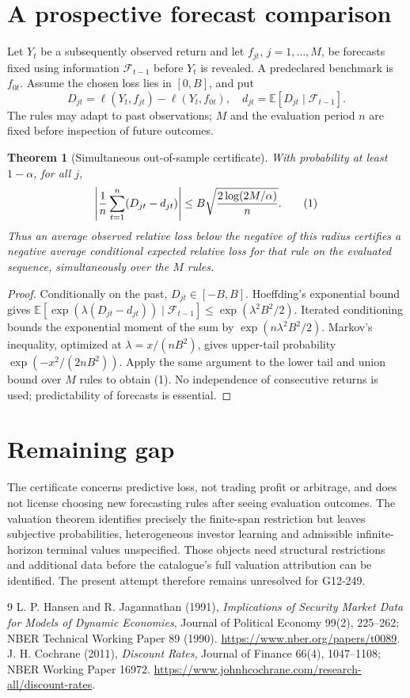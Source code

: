 \documentclass[11pt]{article}
\newtheorem{theorem}{Theorem}
\theoremstyle{definition}
\begin{document}
\section*{A prospective forecast comparison}
Let $Y_t$ be a subsequently observed return and let $f_{jt}$, $j=1,\ldots,M$,
be forecasts fixed using information $\mathcal F_{t-1}$ before $Y_t$ is
revealed. A predeclared benchmark is $f_{0t}$. Assume the chosen loss lies
in $[0,B]$, and put
\[
 D_{jt}=\ell(Y_t,f_{jt})-\ell(Y_t,f_{0t}),\quad
 d_{jt}=\mathbb E[D_{jt}\mid\mathcal F_{t-1}].
\]
The rules may adapt to past observations; $M$ and the evaluation period
$n$ are fixed before inspection of future outcomes.
\begin{theorem}[Simultaneous out-of-sample certificate]
With probability at least $1-\alpha$, for all $j$,
\[
 \left|{1\over n}\sum_{t=1}^n(D_{jt}-d_{jt})\right|
 \le B\sqrt{2\log(2M/\alpha)\over n}. \tag{1}
\]
Thus an average observed relative loss below the negative of this radius
certifies a negative average conditional expected relative loss for that
rule on the evaluated sequence, simultaneously over the $M$ rules.
\end{theorem}
\begin{proof}
Conditionally on the past, $D_{jt}\in[-B,B]$. Hoeffding's exponential
bound gives
$\mathbb E[\exp(\lambda(D_{jt}-d_{jt}))\mid\mathcal F_{t-1}]
\le\exp(\lambda^2B^2/2)$.
Iterated conditioning bounds the exponential moment of the sum by
$\exp(n\lambda^2B^2/2)$. Markov's inequality, optimized at
$\lambda=x/(nB^2)$, gives upper-tail probability
$\exp(-x^2/(2nB^2))$. Apply the same argument to the lower tail and
union bound over $M$ rules to obtain (1). No independence of consecutive
returns is used; predictability of forecasts is essential.
\end{proof}

\section*{Remaining gap}
The certificate concerns predictive loss, not trading profit or arbitrage,
and does not license choosing new forecasting rules after seeing evaluation
outcomes. The valuation theorem identifies precisely the finite-span
restriction but leaves subjective probabilities, heterogeneous investor
learning and admissible infinite-horizon terminal values unspecified.
Those objects need structural restrictions and additional data before the
catalogue's full valuation attribution can be identified. The present
attempt therefore remains unresolved for G12-249.

\begin{thebibliography}{9}
 L. P. Hansen and R. Jagannathan (1991),
\emph{Implications of Security Market Data for Models of Dynamic Economies},
Journal of Political Economy 99(2), 225--262; NBER Technical Working Paper
89 (1990). \url{https://www.nber.org/papers/t0089}.
 J. H. Cochrane (2011), \emph{Discount Rates},
Journal of Finance 66(4), 1047--1108; NBER Working Paper 16972.
\url{https://www.johnhcochrane.com/research-all/discount-rates}.
\end{thebibliography}
\end{document}
